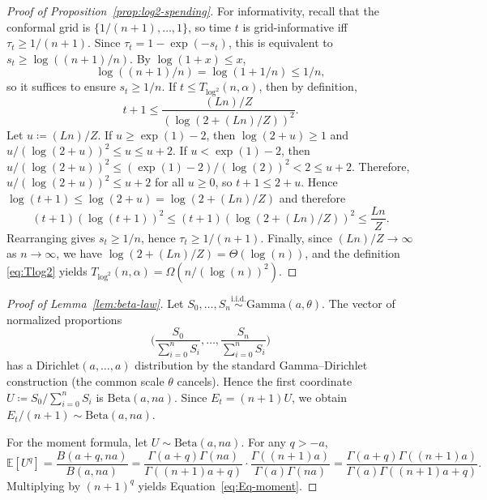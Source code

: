 \documentclass{uai2026} %
\newcommand{\1}{\mathbf{1}}
\newcommand{\expec}{\mathbb{E}}
\begin{document}
\begin{proof}[Proof of Proposition~\ref{prop:log2-spending}]
  For informativity, recall that the conformal grid is $\{1/(n+1),\dots,1\}$, so time $t$ is grid-informative iff $\tau_t\ge 1/(n+1)$.
  Since $\tau_t=1-\exp(-s_t)$, this is equivalent to $s_t\ge \log((n+1)/n)$.
  By $\log(1+x)\le x$,
  \begin{equation*}
    \log((n+1)/n)=\log(1+1/n)\le 1/n,
  \end{equation*}
  so it suffices to ensure $s_t\ge 1/n$.
  If $t\le T_{\log^2}(n,\alpha)$, then by definition,
  \begin{equation*}
    t+1 \le \frac{(L n)/Z}{(\log(2+(L n)/Z))^2}.
  \end{equation*}
  Let $u\coloneqq (L n)/Z$.
  If $u\ge \exp(1)-2$, then $\log(2+u)\ge 1$ and $u/(\log(2+u))^2\le u\le u+2$.
  If $u< \exp(1)-2$, then $u/(\log(2+u))^2\le (\exp(1)-2)/(\log(2))^2<2\le u+2$.
  Therefore, $u/(\log(2+u))^2\le u+2$ for all $u\ge 0$, so $t+1\le 2+u$.
  Hence $\log(t+1)\le \log(2+u)=\log(2+(L n)/Z)$ and therefore
  \begin{equation*}
    (t+1)(\log(t+1))^2
    \le (t+1)(\log(2+(L n)/Z))^2
    \le \frac{L n}{Z}.
  \end{equation*}
  Rearranging gives $s_t\ge 1/n$, hence $\tau_t\ge 1/(n+1)$.
  Finally, since $(L n)/Z\to\infty$ as $n\to\infty$, we have $\log(2+(L n)/Z)=\Theta(\log(n))$, and the definition \eqref{eq:Tlog2} yields $T_{\log^2}(n,\alpha)=\Omega(n/(\log(n))^2)$.
\end{proof}\par\medskip

\begin{proof}[Proof of Lemma~\ref{lem:beta-law}]
  Let $S_{0},\dots,S_{n}\stackrel{\text{i.i.d.}}{\sim}\mathrm{Gamma}(a,\theta)$.
  The vector of normalized proportions
  \begin{equation*}
    \Big(\frac{S_{0}}{\sum_{i=0}^{n} S_{i}},\dots,\frac{S_{n}}{\sum_{i=0}^{n} S_{i}}\Big)
  \end{equation*}
  has a $\mathrm{Dirichlet}(a,\dots,a)$ distribution by the standard Gamma--Dirichlet construction (the common scale $\theta$ cancels).
  Hence the first coordinate $U \coloneqq S_{0}/\sum_{i=0}^{n} S_{i}$ is $\mathrm{Beta}(a,na)$.
  Since $E_{t}=(n+1)U$, we obtain $E_{t}/(n+1)\sim \mathrm{Beta}(a,na)$.

  For the moment formula, let $U\sim\mathrm{Beta}(a,na)$.
  For any $q>-a$,
  \begin{equation*}
    \expec[U^q]=\frac{B(a+q,na)}{B(a,na)}
    =\frac{\Gamma(a+q)\Gamma(na)}{\Gamma((n+1)a+q)}\cdot
    \frac{\Gamma((n+1)a)}{\Gamma(a)\Gamma(na)}
    =\frac{\Gamma(a+q)\Gamma((n+1)a)}{\Gamma(a)\Gamma((n+1)a+q)}.
  \end{equation*}
  Multiplying by $(n+1)^q$ yields Equation~\eqref{eq:Eq-moment}.
\end{proof}\par\medskip
\end{document}
